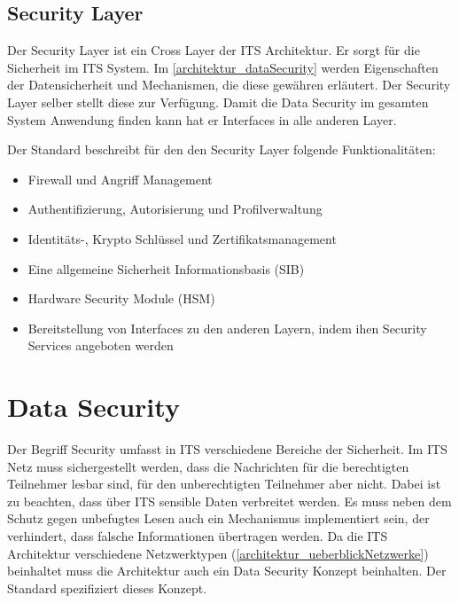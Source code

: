 \subsection{Security Layer \label{architektur_securityLayer}}
Der Security Layer ist ein Cross Layer der \ac{ITS} Architektur. Er sorgt für die Sicherheit im \ac{ITS} System. Im \autoref{architektur_dataSecurity} werden Eigenschaften der Datensicherheit und Mechanismen, die diese gewähren erläutert. Der Security Layer selber stellt diese  zur Verfügung. Damit die Data Security im gesamten System Anwendung finden kann hat er Interfaces in alle anderen Layer. 	

Der Standard \cite{en302665} beschreibt für den den Security Layer folgende Funktionalitäten:
\begin{itemize}
	\item Firewall und Angriff Management
	\item Authentifizierung, Autorisierung und Profilverwaltung
	\item Identitäts-, Krypto Schlüssel und Zertifikatsmanagement
	\item Eine allgemeine Sicherheit Informationsbasis (SIB)
	\item Hardware Security Module (HSM)
	\item Bereitstellung von Interfaces zu den anderen Layern, indem ihen Security Services angeboten werden
\end{itemize} 



\section{Data Security\label{architektur_dataSecurity}}
Der Begriff Security umfasst in \ac{ITS} verschiedene Bereiche der Sicherheit. Im \ac{ITS} Netz muss sichergestellt werden, dass die Nachrichten für die berechtigten Teilnehmer lesbar sind, für den unberechtigten Teilnehmer aber nicht. Dabei ist zu beachten, dass über \ac{ITS} sensible Daten verbreitet werden. Es muss neben dem Schutz gegen unbefugtes Lesen auch ein Mechanismus implementiert sein, der verhindert, dass falsche Informationen übertragen werden. Da die \ac{ITS} Architektur verschiedene Netzwerktypen (\autoref{architektur_ueberblickNetzwerke}) beinhaltet muss die Architektur auch ein Data Security Konzept beinhalten. Der Standard \cite{ts102940} spezifiziert dieses Konzept.  

